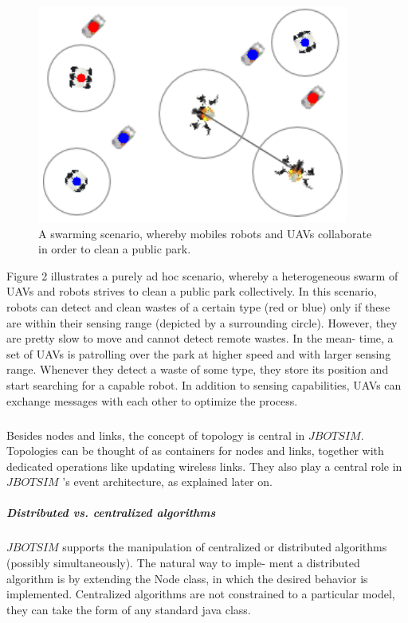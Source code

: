 \begin{figure}[h!]
	\centering
	\includegraphics[width=0.7\linewidth]{fig_3}
	\caption[A swarming scenario, whereby mobiles robots and UAVs collaborate in order to clean a public park.]{A swarming scenario, whereby mobiles robots and UAVs collaborate in order to clean a public park.}
	\label{fig:fig3}
\end{figure}
Figure 2 illustrates a purely ad hoc scenario, whereby a heterogeneous swarm of UAVs and robots strives to clean a public park collectively. In this scenario, robots can detect and clean wastes of a certain type (red or blue) only if these are within their sensing range (depicted by a surrounding circle). However, they are pretty slow to move and cannot detect remote wastes. In the mean- time, a set of UAVs is patrolling over the park at higher speed and with larger sensing range. Whenever they detect a waste of some type, they store its position and start searching for a capable robot. In addition to sensing capabilities, UAVs can exchange messages with each other to optimize the process.
\subparagraph{}Besides nodes and links, the concept of topology is central in  $JBOTSIM$. Topologies can be thought of as containers for nodes and links, together with dedicated operations like updating wireless links. They also play a central role in  $JBOTSIM$ ’s event architecture, as explained later on.
\subparagraph{Distributed vs. centralized algorithms}
\subparagraph{} $JBOTSIM$  supports the manipulation of centralized or distributed algorithms (possibly simultaneously). The natural way to imple- ment a distributed algorithm is by extending the Node class, in which the desired behavior is implemented. Centralized algorithms are not constrained to a particular model, they can take the form of any standard java class.
